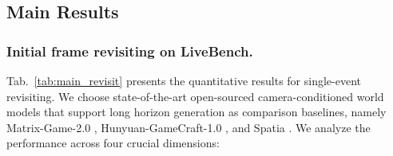 \subsection{Main Results}

\subsubsection{Initial frame revisiting on LiveBench.}
Tab.~\ref{tab:main_revisit} presents the quantitative results for single-event revisiting. We choose state-of-the-art open-sourced camera-conditioned world models that support long horizon generation as comparison baselines, namely Matrix-Game-2.0 \cite{matrixgame}, Hunyuan-GameCraft-1.0 \cite{hunyuangamecraft}, and Spatia \cite{spatia}. We analyze the performance across four crucial dimensions:
\vspace{-2mm}
